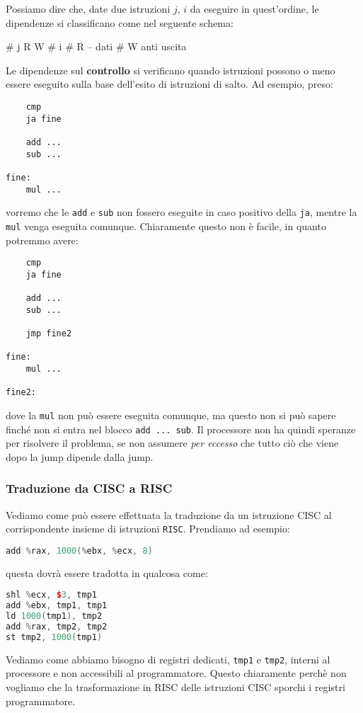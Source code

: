 \documentclass[a4paper,11pt]{article}
\begin{document}
Possiamo dire che, date due istruzioni $j$, $i$ da eseguire in quest'ordine, le dipendenze si classificano come nel seguente schema:

#    j   R    W
# i      
# R      --   dati
# W      anti uscita

Le dipendenze sul \textbf{controllo} si verificano quando istruzioni possono o meno essere eseguito sulla base dell'esito di istruzioni di salto.
Ad esempio, preso:
\begin{lstlisting}	
	cmp
	ja fine

	add ...
	sub ...

fine:
	mul ...
\end{lstlisting}
vorremo che le \lstinline|add| e \lstinline|sub| non fossero eseguite in caso positivo della \lstinline|ja|, mentre la \lstinline|mul| venga eseguita comunque.
Chiaramente questo non è facile, in quanto potremmo avere:
\begin{lstlisting}	
	cmp
	ja fine

	add ...
	sub ...

	jmp fine2

fine:
	mul ...

fine2:
\end{lstlisting}
dove la \lstinline|mul| non può essere eseguita comunque, ma questo non si può sapere finché non si entra nel blocco \lstinline|add ... sub|.
Il processore non ha quindi speranze per risolvere il problema, se non assumere \textit{per eccesso} che tutto ciò che viene dopo la jump dipende dalla jump. 

\subsubsection{Traduzione da CISC a RISC}
Vediamo come può essere effettuata la traduzione da un istruzione CISC al corrispondente insieme di istruzioni \lstinline|RISC|.
Prendiamo ad esempio:
\begin{lstlisting}[language=C++, style=codestyle]	
add %rax, 1000(%ebx, %ecx, 8)
\end{lstlisting}
questa dovrà essere tradotta in qualcosa come:
\begin{lstlisting}[language=C++, style=codestyle]	
shl %ecx, $3, tmp1
add %ebx, tmp1, tmp1
ld 1000(tmp1), tmp2
add %rax, tmp2, tmp2
st tmp2, 1000(tmp1)
\end{lstlisting}

Vediamo come abbiamo bisogno di registri dedicati, \lstinline|tmp1| e \lstinline|tmp2|, interni al processore e non accessibili al programmatore.
Questo chiaramente perchè non vogliamo che la trasformazione in RISC delle istruzioni CISC sporchi i registri programmatore.
\end{document}
